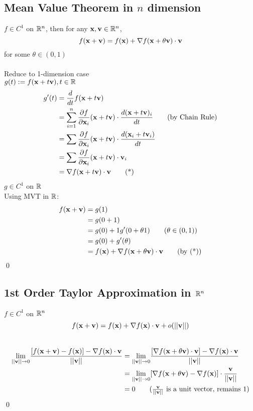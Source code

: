 \documentclass[11pt]{article}
\begin{document}
\subsection{Mean Value Theorem in $n$ dimension}
$f \in C^1$ on $\mathbb{R}^n$, then for any $\textbf{x}, \textbf{v} \in \mathbb{R}^n$,
$$f(\textbf{x} + \textbf{v}) = f(\textbf{x}) + \nabla f(\textbf{x}+ \theta \textbf{v}) \cdot \textbf{v}$$
for some $\theta \in (0,1)$\\\\
 Reduce to 1-dimension case \\
$g(t) := f(\textbf{x}+t\textbf{v}), t \in \mathbb{R}$ \\
\begin{align*}
	g'(t) &= \frac{d}{dt}f(\textbf{x}+t\textbf{v}) \\
	&= \sum_{i=1}^n \frac{\partial f}{\partial \textbf{x}_i}(\textbf{x} + t\textbf{v})\cdot \frac{d(\textbf{x}+t\textbf{v})_i}{dt}
	\tag{by Chain Rule} \\
	&= \sum \frac{\partial f}{\partial \textbf{x}_i}(\textbf{x} + t\textbf{v})\cdot \frac{d(\textbf{x}_i + t\textbf{v}_i)}{dt} \\
	&= \sum \frac{\partial f}{\partial \textbf{x}_i} (\textbf{x} + t\textbf{v})\cdot \textbf{v}_i \\
	&= \nabla f(\textbf{x} + t\textbf{v})\cdot \textbf{v} \tag{*}
\end{align*}
$g \in C^1$ on $\mathbb{R}$\\
Using MVT in $\mathbb{R}$:
\begin{align*}
f(\textbf{x}+\textbf{v}) &= g(1) \\
&= g(0+1) \\
&= g(0) + 1g'(0+\theta 1) \tag{$\theta \in (0,1)$}\\
&= g(0) + g'(\theta) \\
&= f(\textbf{x}) + \nabla f(\textbf{x}+\theta \textbf{v}) \cdot \textbf{v} \tag{by (*)}
\end{align*}
\qed

\subsection{1st Order Taylor Approximation in $\mathbb{R}^n$}
$f \in C^1$ on $\mathbb{R}^n$
$$f(\textbf{x} + \textbf{v}) = f(\textbf{x}) + \nabla f(\textbf{x}) \cdot \textbf{v} + o(||\textbf{v}||)$$
 \\
\begin{align*}
	\underset{||\vv|| \rightarrow 0}{\lim} \frac{[f(\vx + \vv) - f(\vx)] - \nabla f(\vx) \cdot \vv }{||\vv||} 
	&= \underset{||\vv|| \rightarrow 0}{\lim} \frac{[\nabla f(\vx + \theta \vv) \cdot \vv] - \nabla f(\vx) \cdot \vv}{||\vv||} \\
	&= \underset{||\vv|| \rightarrow 0}{\lim} [\nabla f(\vx + \theta \vv) - \nabla f(\vx)] \cdot \frac{\vv}{||\vv||} \\
	&= 0 \tag{$\frac{\vv}{||\vv||}$ is a unit vector, remains 1}
\end{align*}
\qed
\end{document}
